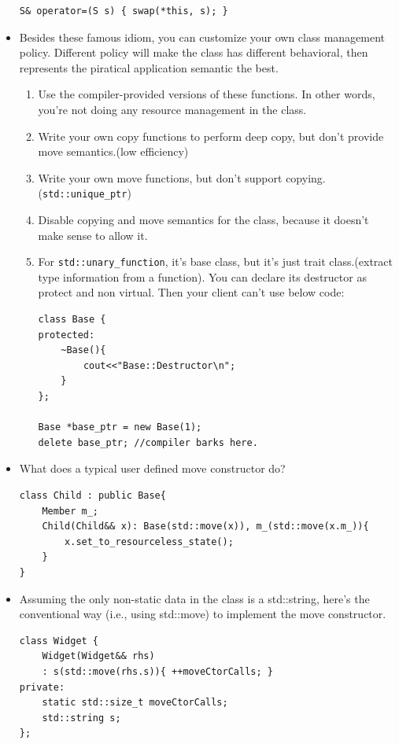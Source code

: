 \documentclass[a4paper,11pt,twoside]{book}
\begin{document}
\begin{itemize}
\begin{lstlisting}[numbers=none]
S& operator=(S s) { swap(*this, s); }
\end{lstlisting}

	
	
	\item Besides these famous idiom, you can customize your own class management policy. Different policy will make the class has different behavioral, then represents the piratical application semantic the best. 
	
	\begin{enumerate}
		\item Use the compiler-provided versions of these functions. In other words, you're not doing any resource management in the class.
		
		\item Write your own copy functions to perform deep copy, but don't provide move semantics.(low efficiency)
		
		\item Write your own move functions, but don't support copying.(\texttt{std::unique\_ptr})
		
		\item Disable copying and move semantics for the class, because it doesn't make sense to allow it.
		
		\item For \texttt{std::unary\_function}, it's base class, but it's just trait class.(extract type information from a function). You can declare its destructor as protect and non virtual. Then your client can't use below code:
\begin{lstlisting}[numbers=none]
class Base {
protected:
	~Base(){
		cout<<"Base::Destructor\n";
	}
};

Base *base_ptr = new Base(1);
delete base_ptr; //compiler barks here.
\end{lstlisting}
		
	\end{enumerate}

	
	\item What does a typical user defined move constructor do?
\begin{lstlisting}[numbers=none]
class Child : public Base{
	Member m_;
	Child(Child&& x): Base(std::move(x)), m_(std::move(x.m_)){
		x.set_to_resourceless_state();
	}
}
	\end{lstlisting}
	
	\item Assuming the only non-static data in the class is a std::string, here's the conventional way (i.e., using std::move) to implement the move constructor. 
\begin{lstlisting}[numbers=none]
class Widget {
	Widget(Widget&& rhs)
	: s(std::move(rhs.s)){ ++moveCtorCalls; }
private:
	static std::size_t moveCtorCalls;
	std::string s;
};
\end{lstlisting}
\end{itemize}
\end{document}
